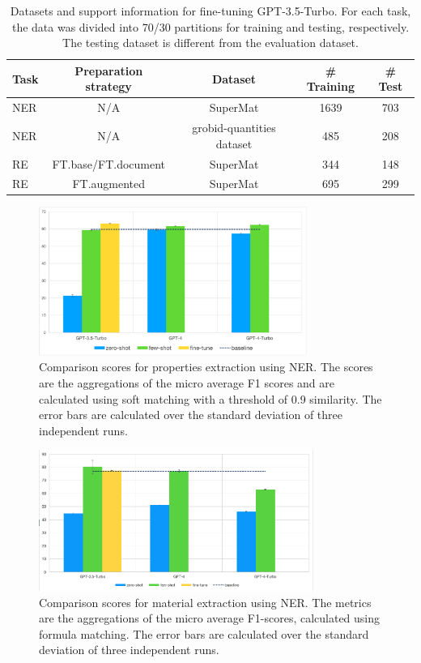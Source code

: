 \begin{table}[htbp]
    \centering
    \label{tab:amount-data-fine-tuned}
    \caption{Datasets and support information for fine-tuning GPT-3.5-Turbo. For each task, the data was divided into 70/30 partitions for training and testing, respectively. The testing dataset is different from the evaluation dataset.  }
    \begin{tabular}{lcccc}
        \textbf{Task} & \textbf{Preparation strategy} & \textbf{Dataset} & \textbf{\# Training} & \textbf{\# Test} \\
        \toprule
        NER & N/A & SuperMat   & 1639 & 703 \\
        NER & N/A & grobid-quantities dataset & 485 & 208 \\
        RE  & FT.base/FT.document & SuperMat   & 344 & 148 \\
        RE  & FT.augmented & SuperMat & 695 & 299 \\
        \bottomrule
    \end{tabular}
\end{table}

\begin{figure}[htbp]
  \centering
  \includegraphics[width=0.78\textwidth]{figures/ner-measeval-all.png} 
  \caption{Comparison scores for properties extraction using NER. The scores are the aggregations of the micro average F1 scores and are calculated using soft matching with a threshold of 0.9 similarity. The error bars are calculated over the standard deviation of three independent runs.}
  \label{fig:ner-measeval-all}
\end{figure}

\begin{figure}[htbp]
  \centering
  \includegraphics[width=0.8\textwidth]{figures/ner-supermat-all.png} 
  \caption{Comparison scores for material extraction using NER. The metrics are the aggregations of the micro average F1-scores, calculated using formula matching. The error bars are calculated over the standard deviation of three independent runs.}
  \label{fig:ner-materials-all}
\end{figure}

